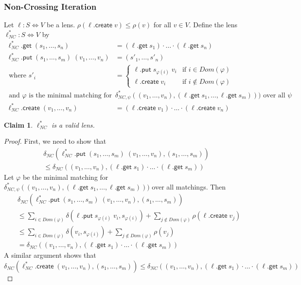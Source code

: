 \documentclass[acmsmall,review,anonymous]{acmart}\settopmatter{printfolios=true,printccs=false,printacmref=false}
\newtheorem{claim}{Claim}
\newcommand{\kw}[1]{\ensuremath{\mathsf{#1}}}
\newcommand{\get}{\ensuremath{\kw{get}}}
\newcommand{\pput}{\ensuremath{\kw{put}}}
\newcommand{\create}{\ensuremath{\kw{create}}}
\begin{document}
\subsubsection{Non-Crossing Iteration}
Let $\ell: S \Leftrightarrow V$ be a lens. $\rho(\ell.\create \;
v) \leq \rho(v)$ for all $v \in V$. Define the lens $\ell^*_{NC}: S
\Leftrightarrow V$ by
\begin{align*}
\ell^*_{NC} .\get \; (s_1, \ldots, s_n) &= (\ell.\get \; s_1) \cdot \ldots \cdot
(\ell.\get \; s_n)\\
\ell^*_{NC} .\pput \; (s_1, \ldots, s_m) \; (v_1, \ldots, v_n) &= (s'_1 , \ldots
, s'_n)\\
\text{ where } s'_i &= \begin{cases}
\ell.\pput \; s_{\varphi(i)} \; v_i & \text{if } i \in Dom(\varphi)\\
\ell.\create \; v_i & \text{if } i \not \in Dom(\varphi)
\end{cases}\\
\text{ and } \varphi \text{ is the minimal matching for }
&\delta^*_{NC, \psi}((v_1, \ldots, v_n), (\ell.\get \; s_1, \ldots, \ell.\get
\; s_m)))\text{ over all }\psi\\
\ell^*_{NC}.\create \; (v_1, \ldots, v_n) &= (\ell.\create
\; v_1) \cdot \ldots \cdot (\ell.\create \; v_n)
\end{align*}
\begin{claim}\label{nocrossingvalid}
$\ell^*_{NC}$ is a valid lens.
\end{claim}
\begin{proof}
First, we need to show that
\begin{multline}\label{noncrossingputexact}
\delta_{NC}(\ell^*_{NC}.\pput \; (s_1, \ldots, s_m) \; (v_1, \ldots, v_n),
(s_1, \ldots, s_m)) \\ \leq  \delta_{NC}((v_1, \ldots, v_n), (\ell.\get \; s_1)
\cdot \ldots \cdot (\ell.\get \; s_m))
\end{multline}
Let $\varphi$ be the minimal matching for $\delta^*_{NC, \psi}((v_1, \ldots,
v_n), (\ell.\get \; s_1, \ldots, \ell.\get \; s_m)))$ over all matchings. Then
\begin{align*}
&\delta_{NC}(\ell^*_{NC} .\pput \; (s_1, \ldots, s_m) \; (v_1, \ldots,
v_n), (s_1, \ldots, s_m))\\ 
&\leq \sum_{i \in Dom(\varphi)} \delta(\ell.\pput \;
s_{\varphi(i)} \; v_i, s_{\varphi(i)}) + \sum_{j \not \in Dom(\varphi)}
\rho(\ell.\create \; v_j)\\
&\leq \sum_{i \in Dom(\varphi)} \delta(v_i, s_{\varphi(i)}) + \sum_{j \not
\in Dom(\varphi)} \rho(v_j)\\
&= \delta_{NC}((v_1, \ldots, v_n), (\ell.\get \; s_1) \cdot \ldots \cdot
(\ell.\get \; s_m))
\end{align*}
A similar argument shows that 
$$\delta_{NC}(\ell^*_{NC}.\create \; (v_1, \ldots, v_n),(s_1, \ldots, s_m)) \leq
\delta_{NC}((v_1, \ldots, v_n), (\ell.\get \; s_1) \cdot \ldots \cdot
(\ell.\get \; s_m))$$
\end{proof}
\end{document}
